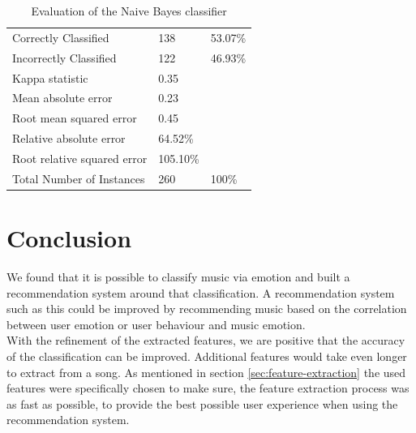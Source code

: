 \documentclass{sigchi-ext}
\begin{document}
\begin{table}
  \centering
  \begin{tabular}{@{}lll@{}}
    Correctly Classified          & 138       & 53.07\% \\
    Incorrectly Classified        & 122       & 46.93\% \\
    Kappa statistic               & 0.35      & \\
    Mean absolute error           & 0.23      & \\
    Root mean squared error       & 0.45      & \\
    Relative absolute error       & 64.52\%   & \\
    Root relative squared error   & 105.10\%  & \\
    Total Number of Instances     & 260       & 100\%
  \end{tabular}
  \caption{Evaluation of the Naive Bayes classifier}
\end{table}

\section{Conclusion}
We found that it is possible to classify music via emotion and built a recommendation system around that classification. A recommendation system such as this could be improved by recommending music based on the correlation between user emotion or user behaviour and music emotion.\\
With the refinement of the extracted features, we are positive that the accuracy of the classification can be improved. Additional features would take even longer to extract from a song. As mentioned in section \ref{sec:feature-extraction} the used features were specifically chosen to make sure, the feature extraction process was as fast as possible, to provide the best possible user experience when using the recommendation system.



\end{document}

